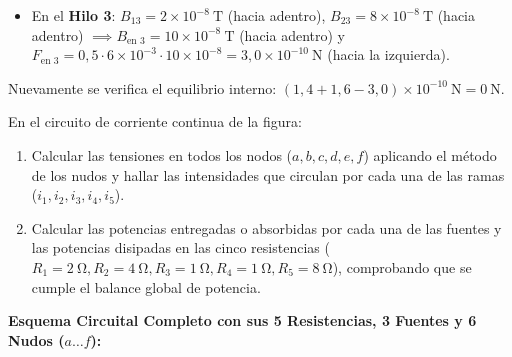 \begin{ejercicio}
\begin{itemize}[leftmargin=*]
    \item En el \textbf{Hilo 3}: $B_{13} = 2 \times 10^{-8}\ \si{\tesla}$ (hacia adentro), $B_{23} = 8 \times 10^{-8}\ \si{\tesla}$ (hacia adentro) $\implies B_{\text{en } 3} = 10 \times 10^{-8}\ \si{\tesla}$ (hacia adentro) y $F_{\text{en } 3} = 0{,}5 \cdot 6 \times 10^{-3} \cdot 10 \times 10^{-8} = 3{,}0 \times 10^{-10}\ \si{\newton}$ (hacia la izquierda).
\end{itemize}
Nuevamente se verifica el equilibrio interno: $(1{,}4 + 1{,}6 - 3{,}0) \times 10^{-10}\ \si{\newton} = 0\ \si{\newton}$.
\end{ejercicio}

\begin{ejercicio}
En el circuito de corriente continua de la figura:
\begin{enumerate}[label=\alph*)]
    \item Calcular las tensiones en todos los nodos ($a, b, c, d, e, f$) aplicando el método de los nudos y hallar las intensidades que circulan por cada una de las ramas ($i_1, i_2, i_3, i_4, i_5$).
    \item Calcular las potencias entregadas o absorbidas por cada una de las fuentes y las potencias disipadas en las cinco resistencias ($R_1 = 2\ \si{\ohm}, R_2 = 4\ \si{\ohm}, R_3 = 1\ \si{\ohm}, R_4 = 1\ \si{\ohm}, R_5 = 8\ \si{\ohm}$), comprobando que se cumple el balance global de potencia.
\end{enumerate}
\tcbline
\textbf{Esquema Circuital Completo con sus 5 Resistencias, 3 Fuentes y 6 Nudos ($a \dots f$):}\\[4pt]
\begin{center}
\end{center}
\end{ejercicio}
